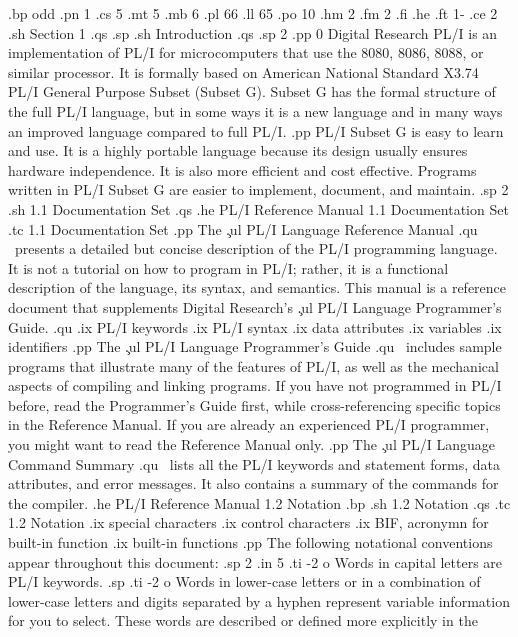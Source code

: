 .bp odd
.pn 1
.cs 5
.mt 5
.mb 6
.pl 66
.ll 65
.po 10
.hm 2
.fm 2
.fi
.he
.ft                                1-%
.ce 2
.sh
Section 1
.qs
.sp
.sh
Introduction
.qs
.sp 2
.pp 0
Digital Research PL/I is an implementation of PL/I for microcomputers that use
the 8080, 8086, 8088, or similar processor.  It is formally based on American
National Standard X3.74 PL/I General Purpose Subset (Subset G).  Subset G has
the formal structure of the full PL/I language, but in some ways it is a new
language and in many ways an improved language compared to full PL/I.
.pp
PL/I Subset G is easy to learn and use.  It is a highly portable language
because its design usually ensures hardware independence.  It is also more
efficient and cost effective.  Programs written in PL/I Subset G are easier to
implement, document, and maintain.
.sp 2
.sh
1.1  Documentation Set
.qs
.he PL/I Reference Manual                      1.1  Documentation Set
.tc    1.1  Documentation Set
.pp
The \c 
.ul
PL/I Language Reference Manual
.qu
\ presents a detailed but concise description of the PL/I programming 
language.  It is not a tutorial on how to program in PL/I; rather, it is a 
functional description of the language, its syntax, and semantics.  
This manual is a reference document that supplements Digital 
Research's \c 
.ul
PL/I Language Programmer's Guide.
.qu
.ix PL/I keywords
.ix PL/I syntax
.ix data attributes
.ix variables
.ix identifiers
.pp
The \c 
.ul
PL/I Language Programmer's Guide
.qu
\ includes sample programs that illustrate many of the features of 
PL/I, as well as the mechanical aspects of compiling and linking 
programs.  If you have not programmed in PL/I before, read 
the Programmer's Guide first, while cross-referencing specific topics 
in the Reference Manual.  If you are already an experienced PL/I 
programmer, you might want to read the Reference Manual only.
.pp
The \c 
.ul
PL/I Language Command Summary
.qu
\ lists all the PL/I keywords and statement forms, data attributes, and 
error messages.  It also contains a summary of the commands for the 
compiler.
.he PL/I Reference Manual                               1.2  Notation
.bp
.sh
1.2  Notation
.qs
.tc    1.2  Notation
.ix special characters
.ix control characters
.ix BIF, acronymn for built-in function
.ix built-in functions
.pp
The following notational conventions appear throughout this document:
.sp 2
.in 5
.ti -2
o Words in capital letters are PL/I keywords.
.sp
.ti -2
o Words in lower-case letters or in a combination of lower-case letters 
and digits separated by a hyphen represent variable information for you 
to select.  These words are described or defined more explicitly in the 
